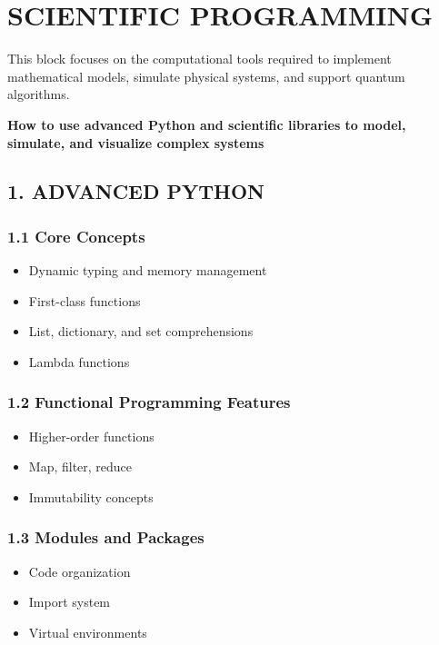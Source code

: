 \chapter{SCIENTIFIC PROGRAMMING}

This block focuses on the computational tools required to implement mathematical models, simulate physical systems, and support quantum algorithms.

\begin{center}
\textbf{How to use advanced Python and scientific libraries to model, simulate, and visualize complex systems}
\end{center}

\vspace{0.5cm}

\section*{1. ADVANCED PYTHON}

\subsection*{1.1 Core Concepts}

\begin{itemize}
\item Dynamic typing and memory management
\item First-class functions
\item List, dictionary, and set comprehensions
\item Lambda functions
\end{itemize}

\subsection*{1.2 Functional Programming Features}

\begin{itemize}
\item Higher-order functions
\item Map, filter, reduce
\item Immutability concepts
\end{itemize}

\subsection*{1.3 Modules and Packages}

\begin{itemize}
\item Code organization
\item Import system
\item Virtual environments
\end{itemize}

